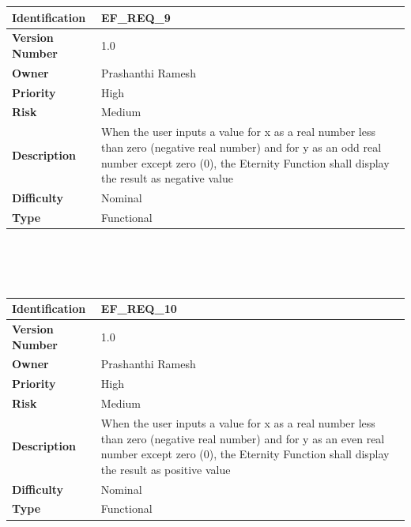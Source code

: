 \documentclass[11pt, english]{report}
\begin{document}
\setlength{\tabcolsep}{18pt}
\renewcommand{\arraystretch}{1.5}
\begin{tabular}{ |p{2.2cm}|p{9.8cm}| }
\hline
\textbf{Identification} &  EF\_REQ\_9 \\ \hline 
\textbf{Version Number} & 1.0 \\ \hline 
\textbf{Owner} & Prashanthi Ramesh  \\ \hline
\textbf{Priority} & High  \\ \hline
\textbf{Risk} & Medium  \\ \hline
\textbf{Description} & When the user inputs a value for x as a real number less than zero (negative real number) and for y as an odd real number except zero (0), the Eternity Function shall display the result as negative value\\ \hline
\textbf{Difficulty} & Nominal  \\ \hline
\textbf{Type} & Functional \\ 
\hline
\end{tabular} \\ \\ \\ 

\setlength{\tabcolsep}{18pt}
\renewcommand{\arraystretch}{1.5}
\begin{tabular}{ |p{2.2cm}|p{9.8cm}| }
\hline
\textbf{Identification} &  EF\_REQ\_10 \\ \hline 
\textbf{Version Number} & 1.0 \\ \hline 
\textbf{Owner} & Prashanthi Ramesh  \\ \hline
\textbf{Priority} & High  \\ \hline
\textbf{Risk} & Medium  \\ \hline
\textbf{Description} & When the user inputs a value for x as a real number less than zero (negative real number) and for y as an even real number except zero (0), the Eternity Function shall display the result as positive value\\ \hline
\textbf{Difficulty} & Nominal  \\ \hline
\textbf{Type} & Functional \\ 
\hline
\end{tabular} \\ \\ \\ 
\end{document}
